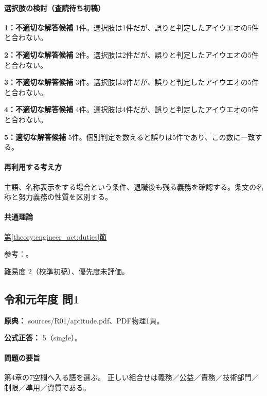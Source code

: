 \paragraph{選択肢の検討（査読待ち初稿）}\mbox{}\par

\noindent\textbf{1：不適切な解答候補} 1件。選択肢は1件だが、誤りと判定したアイウエオの5件と合わない。\par

\noindent\textbf{2：不適切な解答候補} 2件。選択肢は2件だが、誤りと判定したアイウエオの5件と合わない。\par

\noindent\textbf{3：不適切な解答候補} 3件。選択肢は3件だが、誤りと判定したアイウエオの5件と合わない。\par

\noindent\textbf{4：不適切な解答候補} 4件。選択肢は4件だが、誤りと判定したアイウエオの5件と合わない。\par

\noindent\textbf{5：適切な解答候補} 5件。個別判定を数えると誤りは5件であり、この数に一致する。\par

\paragraph{再利用する考え方} 主語、名称表示をする場合という条件、退職後も残る義務を確認する。条文の名称と努力義務の性質を区別する。

\paragraph{共通理論} \hyperref[theory:engineer_act:duties]{第\ref*{theory:engineer_act:duties}節}

\par 参考：\cite{engineer_act_current}。

\par 難易度 2（校準初稿）、優先度未評価。

\subsection{令和元年度 問1}
\label{q:r01-reg-apt-01}

\noindent\textbf{原典：} sources/R01/aptitude.pdf、PDF物理1頁。

\textbf{公式正答：} 5（single）。

\paragraph{問題の要旨} 第4章の7空欄へ入る語を選ぶ。 正しい組合せは義務／公益／責務／技術部門／制限／準用／資質である。

